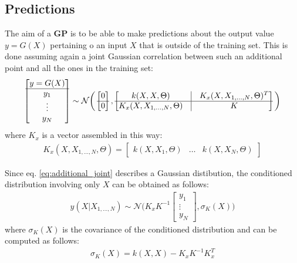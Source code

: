 \documentclass{article}
\begin{document}
\subsection{Predictions}
\label{sec:predictions_scalar}

The aim of a \textbf{GP} is to be able to make predictions about the output value $y = G(X)$ pertaining o an input $X$ that is outside of the training set. This is done assuming again a joint Gaussian correlation between such an additional point and all the ones in the training set: 
\begin{eqnarray}
\begin{bmatrix} y = G(X) \\ \hline y_1 \\ \vdots \\ y_N \end{bmatrix} \sim \mathcal{N} 
\bigg (
\begin{bmatrix} 0 \\ \hline 0 \end{bmatrix},
\begin{bmatrix}
k(X,X, \Theta) & \vline & K_x(X, X_{1,\hdots,N}, \Theta)^T \\ 
\hline
K_x(X, X_{1,\hdots,N}, \Theta) & \vline & K
\end{bmatrix}
\bigg )
\end{eqnarray}
where $K_x$ is a vector assembled in this way:
\begin{eqnarray}
K_x(X, X_{1,\hdots,N}, \Theta) = \begin{bmatrix}
k(X, X_1 , \Theta) & \hdots & k(X, X_N , \Theta)
\end{bmatrix}
\label{eq:additional_joint}
\end{eqnarray}

Since eq. \ref{eq:additional_joint} describes a Gaussian distibution, the conditioned distribution involving only $X$ can be obtained as follows:
\begin{eqnarray}
y(X | X_{1,\hdots,N}) 
\sim \mathcal{N} \bigg ( 
K_x K^{-1} \begin{bmatrix} y_1 \\ \vdots \\ y_N \end{bmatrix} , 
\sigma_K(X)
\bigg )  
\label{eq:scalar_prediction}
\end{eqnarray}
where $\sigma_K(X)$ is the covariance of the conditioned distribution and can be computed as follows:
\begin{eqnarray}
\sigma_K(X) =
k(X,X) - K_x K^{-1} K_x^T
\end{eqnarray}
\end{document}

